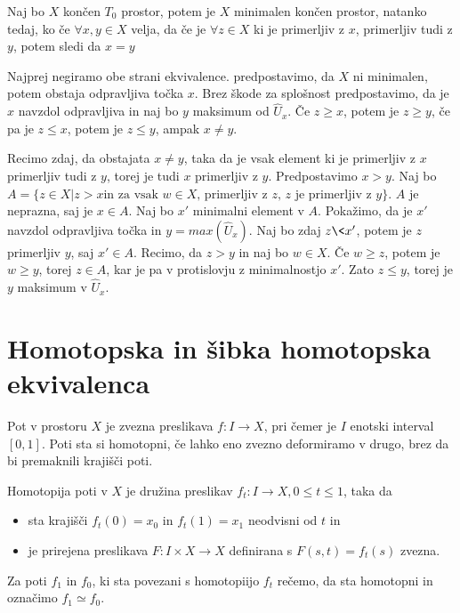 \begin{trditev}
Naj bo $X$ končen $T_0$ prostor, potem je $X$ minimalen končen prostor, natanko tedaj, ko če $\forall x,y\in X$ velja, da če je  $\forall z\in X$ ki je primerljiv z $x$, primerljiv tudi z $y$, potem sledi da $x=y$
\end{trditev}

\begin{dokaz}
    Najprej negiramo obe strani ekvivalence. predpostavimo, da $X$ ni minimalen, potem obstaja odpravljiva točka $x$. Brez škode za splošnost predpostavimo, da je $x$ navzdol odpravljiva in naj bo $y$ maksimum od $\hat{U}_x$. Če $z\geq x$, potem je $z\geq y$, če pa je $z\le x$, potem je $z\leq y$, ampak $x\neq y$.

    Recimo zdaj, da obstajata $x\neq y$, taka da je vsak 
    element ki je primerljiv z $x$ primerljiv tudi z $y$, 
    torej je tudi $x$ primerljiv z $y$. Predpostavimo 
    $x>y$. Naj bo $A=\{z\in X |  z>x \text{in za vsak $w\in 
    X$, primerljiv z $z$, $z$ je primerljiv z $y$}\}$. $A$ 
    je neprazna, saj je $x\in A$. Naj bo $x'$ minimalni 
    element v $A$. Pokažimo, da je $x'$ navzdol odpravljiva 
    točka in $y=max(\hat{U}_x)$. Naj bo zdaj $z\<x'$, potem 
    je $z$ primerljiv $y$, saj $x'\in A$. Recimo, da $z>y$ 
    in naj bo $w\in X$. Če $w\geq z$, potem je $w\geq y$, 
    torej $z\in A$, kar je pa v protislovju z minimalnostjo 
    $x'$. Zato $z\leq y$, torej je $y$ maksimum v 
    $\hat{U}_x$.
\end{dokaz}



\section{Homotopska in šibka homotopska ekvivalenca}

Pot v prostoru $X$ je zvezna preslikava $ f: I \rightarrow X$, pri čemer je $I$ enotski interval $[0,1]$. Poti sta si homotopni, če lahko eno zvezno deformiramo v drugo, brez da bi premaknili krajišči poti.
\begin{definicija}
    
    Homotopija poti v $X$ je družina preslikav $f_t:I \rightarrow X, 0\le t \le 1$, taka da
    \begin{itemize}
        \item 
        sta krajišči $f_t(0) = x_0$ in $f_t(1) = x_1$ neodvisni od $t$ in
        \item 
        je prirejena preslikava $F:I\times X \rightarrow X$ definirana s $F(s,t) = f_t(s)$ zvezna.
    \end{itemize}
    Za poti $f_1$ in $f_0$, ki sta povezani s homotopiijo $f_t$ rečemo, da sta homotopni in označimo $f_1 \simeq f_0$.
\end{definicija}

